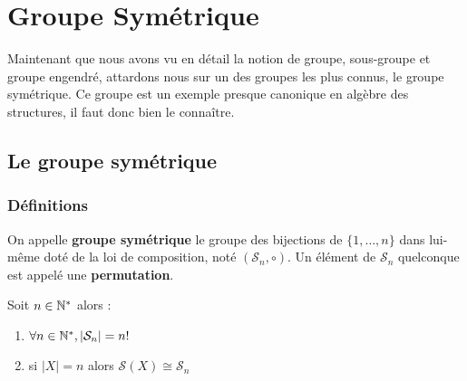 \chapter{Groupe Symétrique}

\setlength{\parindent}{0pt}
\renewcommand{\labelitemi}{\textbullet} %


Maintenant que nous avons vu en détail la notion de groupe, sous-groupe et groupe engendré, 
attardons nous sur un des groupes les plus connus, le groupe symétrique. 
Ce groupe est un exemple presque canonique en algèbre des structures, il faut donc bien le connaître. 


\section{Le groupe symétrique}

\subsection{Définitions}

\begin{definition}
	On appelle \textbf{groupe symétrique} le groupe des bijections de $\{1, \dots ,n\}$ dans lui-même doté de la loi de composition, noté $(\mathcal{S}_n,\circ)$.
	Un élément de $\mathcal{S}_n$ quelconque est appelé une \textbf{permutation}.
\end{definition} 

\begin{prop}
	Soit $n \in \mathbb{N}^*$ alors :
	\begin{enumerate}
		\item $ \forall n \in \mathbb{N}^*, |\mathcal{S}_n| = n ! $
		\item si $ |X| = n $ alors $ \mathcal{S}(X) \cong \mathcal{S}_n $
	\end{enumerate}
\end{prop}

